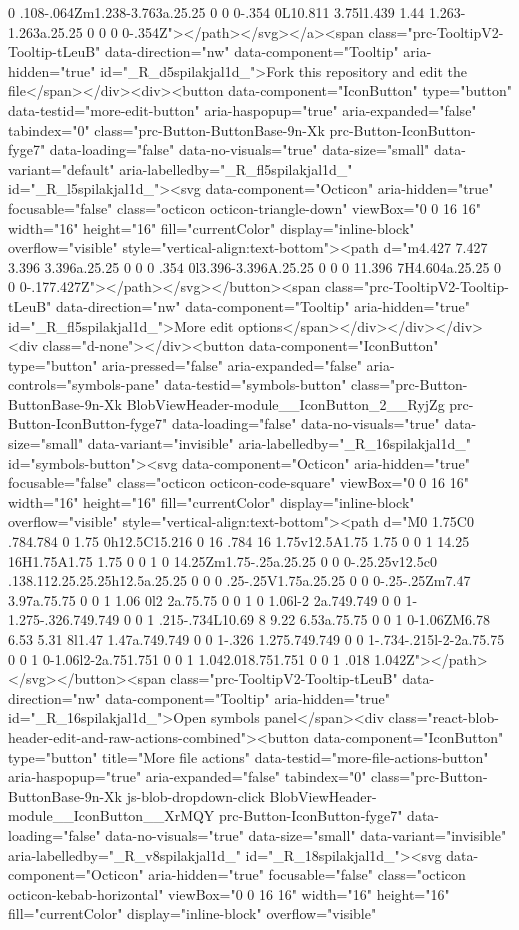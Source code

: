 {{{{{0 .108-.064Zm1.238-3.763a.25.25 0 0 0-.354 0L10.811 3.75l1.439 1.44 1.263-1.263a.25.25 0 0 0 0-.354Z"></path></svg></a><span class="prc-TooltipV2-Tooltip-tLeuB" data-direction="nw" data-component="Tooltip" aria-hidden="true" id="_R_d5spilakjal1d_">Fork this repository and edit the file</span></div><div><button data-component="IconButton" type="button" data-testid="more-edit-button" aria-haspopup="true" aria-expanded="false" tabindex="0" class="prc-Button-ButtonBase-9n-Xk prc-Button-IconButton-fyge7" data-loading="false" data-no-visuals="true" data-size="small" data-variant="default" aria-labelledby="_R_fl5spilakjal1d_" id="_R_l5spilakjal1d_"><svg data-component="Octicon" aria-hidden="true" focusable="false" class="octicon octicon-triangle-down" viewBox="0 0 16 16" width="16" height="16" fill="currentColor" display="inline-block" overflow="visible" style="vertical-align:text-bottom"><path d="m4.427 7.427 3.396 3.396a.25.25 0 0 0 .354 0l3.396-3.396A.25.25 0 0 0 11.396 7H4.604a.25.25 0 0 0-.177.427Z"></path></svg></button><span class="prc-TooltipV2-Tooltip-tLeuB" data-direction="nw" data-component="Tooltip" aria-hidden="true" id="_R_fl5spilakjal1d_">More edit options</span></div></div></div><div class="d-none"></div><button data-component="IconButton" type="button" aria-pressed="false" aria-expanded="false" aria-controls="symbols-pane" data-testid="symbols-button" class="prc-Button-ButtonBase-9n-Xk BlobViewHeader-module__IconButton_2__RyjZg prc-Button-IconButton-fyge7" data-loading="false" data-no-visuals="true" data-size="small" data-variant="invisible" aria-labelledby="_R_16spilakjal1d_" id="symbols-button"><svg data-component="Octicon" aria-hidden="true" focusable="false" class="octicon octicon-code-square" viewBox="0 0 16 16" width="16" height="16" fill="currentColor" display="inline-block" overflow="visible" style="vertical-align:text-bottom"><path d="M0 1.75C0 .784.784 0 1.75 0h12.5C15.216 0 16 .784 16 1.75v12.5A1.75 1.75 0 0 1 14.25 16H1.75A1.75 1.75 0 0 1 0 14.25Zm1.75-.25a.25.25 0 0 0-.25.25v12.5c0 .138.112.25.25.25h12.5a.25.25 0 0 0 .25-.25V1.75a.25.25 0 0 0-.25-.25Zm7.47 3.97a.75.75 0 0 1 1.06 0l2 2a.75.75 0 0 1 0 1.06l-2 2a.749.749 0 0 1-1.275-.326.749.749 0 0 1 .215-.734L10.69 8 9.22 6.53a.75.75 0 0 1 0-1.06ZM6.78 6.53 5.31 8l1.47 1.47a.749.749 0 0 1-.326 1.275.749.749 0 0 1-.734-.215l-2-2a.75.75 0 0 1 0-1.06l2-2a.751.751 0 0 1 1.042.018.751.751 0 0 1 .018 1.042Z"></path></svg></button><span class="prc-TooltipV2-Tooltip-tLeuB" data-direction="nw" data-component="Tooltip" aria-hidden="true" id="_R_16spilakjal1d_">Open symbols panel</span><div class="react-blob-header-edit-and-raw-actions-combined"><button data-component="IconButton" type="button" title="More file actions" data-testid="more-file-actions-button" aria-haspopup="true" aria-expanded="false" tabindex="0" class="prc-Button-ButtonBase-9n-Xk js-blob-dropdown-click BlobViewHeader-module__IconButton__XrMQY prc-Button-IconButton-fyge7" data-loading="false" data-no-visuals="true" data-size="small" data-variant="invisible" aria-labelledby="_R_v8spilakjal1d_" id="_R_18spilakjal1d_"><svg data-component="Octicon" aria-hidden="true" focusable="false" class="octicon octicon-kebab-horizontal" viewBox="0 0 16 16" width="16" height="16" fill="currentColor" display="inline-block" overflow="visible" }}}}}
